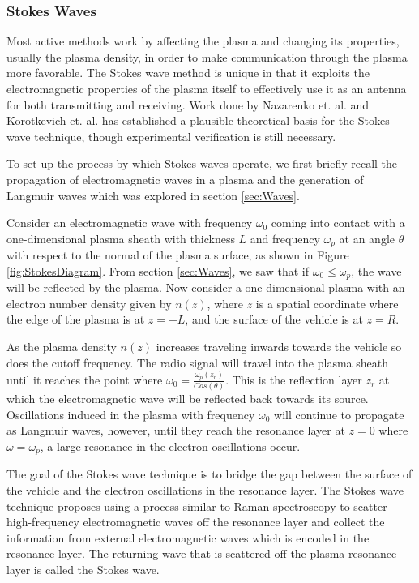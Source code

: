 \documentclass[twocolumn]{article}
\begin{document}
		\subsubsection*{Stokes Waves}
			Most active methods work by affecting the plasma and changing its properties, usually the plasma density, in order to make communication through the plasma more favorable.
			The Stokes wave method is unique in that it exploits the electromagnetic properties of the plasma itself to effectively use it as an antenna for both transmitting and receiving.
			Work done by Nazarenko et. al. and Korotkevich et. al. has established a plausible theoretical basis for the Stokes wave technique, though experimental verification is still necessary.\cite{nazarenko_communication_1994}\cite{korotkevich_communication_2007}
			
			To set up the process by which Stokes waves operate, we first briefly recall the propagation of electromagnetic waves in a plasma and the generation of Langmuir waves which was explored in section \ref{sec:Waves}.
			
			Consider an electromagnetic wave with frequency $\omega_0$ coming into contact with a one-dimensional plasma sheath with thickness $L$ and frequency $\omega_p$ at an angle $\theta$ with respect to the normal of the plasma surface, as shown in Figure \ref{fig:StokesDiagram}.
			From section \ref{sec:Waves}, we saw that if $\omega_0 \leq \omega_p$, the wave will be reflected by the plasma.
			Now consider a one-dimensional plasma with an electron number density given by $n(z)$, where $z$ is a spatial coordinate where the edge of the plasma is at $z=-L$, and the surface of the vehicle is at $z=R$.
			
			As the plasma density $n(z)$ increases traveling inwards towards the vehicle so does the cutoff frequency.
			The radio signal will travel into the plasma sheath until it reaches the point where $\omega_0 = \frac{\omega_p(z_r)}{Cos(\theta)}$.
			This is the reflection layer $z_r$ at which the electromagnetic wave will be reflected back towards its source.
			Oscillations induced in the plasma with frequency $\omega_0$ will continue to propagate as Langmuir waves, however, until they reach the resonance layer at $z=0$ where
			$\omega = \omega_p$, a large resonance in the electron oscillations occur.
			
			The goal of the Stokes wave technique is to bridge the gap between the surface of the vehicle and the electron oscillations in the resonance layer.
			The Stokes wave technique proposes using a process similar to Raman spectroscopy to scatter high-frequency electromagnetic waves off the resonance layer and collect the information from external electromagnetic waves which is encoded in the resonance layer.\cite{nazarenko_communication_1994}
			The returning wave that is scattered off the plasma resonance layer is called the Stokes wave.
			
\end{document}
